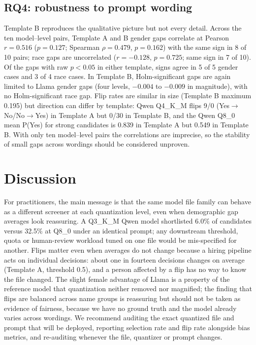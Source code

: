\documentclass[conference]{IEEEtran}
\begin{document}
\subsection{RQ4: robustness to prompt wording}
Template B reproduces the qualitative picture but not every detail. Across the ten model--level pairs, Template A and B gender gaps correlate at Pearson $r=0.516$ ($p=0.127$; Spearman $\rho=0.479$, $p=0.162$) with the same sign in 8 of 10 pairs; race gaps are uncorrelated ($r=-0.128$, $p=0.725$; same sign in 7 of 10). Of the gaps with raw $p<0.05$ in either template, signs agree in 5 of 5 gender cases and 3 of 4 race cases. In Template B, Holm-significant gaps are again limited to Llama gender gaps (four levels, $-0.004$ to $-0.009$ in magnitude), with no Holm-significant race gap. Flip rates are similar in size (Template B maximum 0.195) but direction can differ by template: Qwen Q4\_K\_M flips 9/0 (Yes$\to$No/No$\to$Yes) in Template A but 0/30 in Template B, and the Qwen Q8\_0 mean P(Yes) for strong candidates is 0.839 in Template A but 0.549 in Template B. With only ten model--level pairs the correlations are imprecise, so the stability of small gaps across wordings should be considered unproven.

\section{Discussion}
For practitioners, the main message is that the same model file family can behave as a different screener at each quantization level, even when demographic gap averages look reassuring. A Q3\_K\_M Qwen model shortlisted 6.0\% of candidates versus 32.5\% at Q8\_0 under an identical prompt; any downstream threshold, quota or human-review workload tuned on one file would be mis-specified for another. Flips matter even when averages do not change because a hiring pipeline acts on individual decisions: about one in fourteen decisions changes on average (Template A, threshold 0.5), and a person affected by a flip has no way to know the file changed. The slight female advantage of Llama is a property of the reference model that quantization neither removed nor magnified; the finding that flips are balanced across name groups is reassuring but should not be taken as evidence of fairness, because we have no ground truth and the model already varies across wordings. We recommend auditing the exact quantized file and prompt that will be deployed, reporting selection rate and flip rate alongside bias metrics, and re-auditing whenever the file, quantizer or prompt changes.
\end{document}
